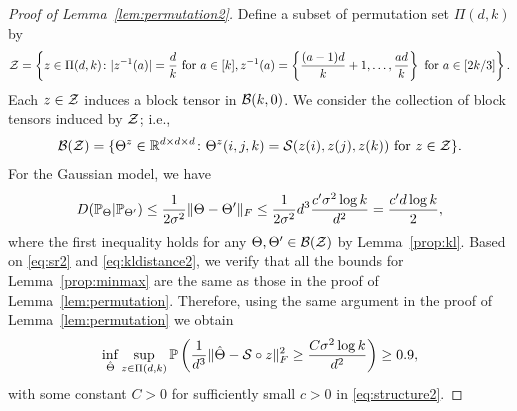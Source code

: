 \documentclass[12pt]{article}
\theoremstyle{definition}
\begin{document}
\begin{proof}[Proof of Lemma~\ref{lem:permutation2}]
Define a subset of permutation set $\Pi(d,k)$ by
\begin{align}
    \mathcal{Z} = \left\{z\in \Pi(d,k)\colon |z^{-1}(a)| = \frac{d}{k} \text{ for } a\in[k], z^{-1}(a) = \left\{\frac{(a-1)d}{k}+1,\ldots,\frac{ad}{k}\right\}  \text{ for } a\in[2k/3] \right\}.
\end{align}
Each $z\in\mathcal{Z}$ induces a block tensor in $\mathcal{B}(k,0)$. We consider the collection of block tensors induced by $\mathcal{Z}$; i.e.,
\begin{align}
    \mathcal{B}(\mathcal{Z}) = \{\Theta^z\in\mathbb{R}^{d\times d\times d}\colon \Theta^z(i,j,k) = \mathcal{S}(z(i),z(j),z(k)) \text{ for } z\in\mathcal{Z}\}.
\end{align}
For the Gaussian model, we have
\begin{align}\label{eq:kldistance2}
    D(\mathbb{P}_\Theta|\mathbb{P}_{\Theta'})\leq \frac{1}{2\sigma^2}\lVert\Theta-\Theta'\rVert_F\leq \frac{1}{2\sigma^2}d^3 \frac{c'\sigma^2\log k}{d^2}=\frac{c'd\log k}{2},
\end{align}where the first inequality holds for any $\Theta,\Theta'\in\mathcal{B}(\mathcal{Z})$ by Lemma~\ref{prop:kl}.
Based on \eqref{eq:sr2} and \eqref{eq:kldistance2}, we verify that all the  bounds for Lemma~\ref{prop:minmax} are the same as those in the proof of Lemma~\ref{lem:permutation}.
Therefore, using the same argument in the proof of Lemma~\ref{lem:permutation} we obtain
\begin{align}
    \inf_{\hat\Theta}\sup_{z\in\Pi(d,k)}\mathbb{P}\left(\frac{1}{d^3}\lVert\hat\Theta-\mathcal{S}\circ z\rVert_F^2\geq \frac{C\sigma^2\log k}{d^2}\right)\geq 0.9,
\end{align}
with some constant $C>0$  for sufficiently small $c>0$ in \eqref{eq:structure2}.
\end{proof}
\end{document}
